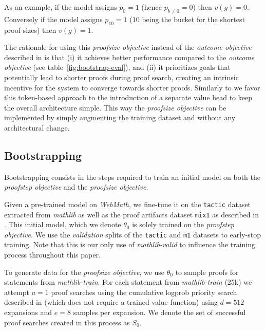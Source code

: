 \documentclass[nohyperref]{article}
\theoremstyle{plain}
\theoremstyle{definition}
\theoremstyle{remark}
\begin{document}
As an example, if the model assigns $p_0=1$ (hence $p_{b \neq 0}=0$) then $v(g)=0$. Conversely if the model assigns $p_{10}=1$ ($10$ being the bucket for the shortest proof sizes) then $v(g)=1$.

The rationale for using this \textit{proofsize objective} instead of the \textit{outcome objective} described in \citet{polu2020generative} is that (i) it achieves better performance compared to the \textit{outcome objective} (see table~\ref{fig:bootstrap-eval}), and (ii) it prioritizes goals that potentially lead to shorter proofs during proof search, creating an intrinsic incentive for the system to converge towards shorter proofs. Similarly to \citet{polu2020generative} we favor this token-based approach to the introduction of a separate value head to keep the overall architecture simple. This way the \textit{proofsize objective} can be implemented by simply augmenting the training dataset and without any architectural change.


\subsection{Bootstrapping}
\label{boostrapping}

Bootstrapping consists in the steps required to train an initial model on both the \textit{proofstep objective} and the \textit{proofsize objective}.

Given a pre-trained model on \textit{WebMath}, we fine-tune it on the \texttt{tactic} dataset extracted from \textit{mathlib} as well as the proof artifacts dataset \texttt{mix1} as described in \citet{han2021proof}. This initial model, which we denote $\theta_0$ is solely trained on the \textit{proofstep objective}. We use the \textit{validation} splits of the \texttt{tactic} and \texttt{m1} datasets to early-stop training. Note that this is our only use of \textit{mathlib-valid} to influence the training process throughout this paper.

To generate data for the \textit{proofsize objective}, we use $\theta_0$ to sample proofs for statements from \textit{mathlib-train}. For each statement from \textit{mathlib-train} (25k) we attempt $a=1$ proof searches using the cumulative logprob priority search described in \citet{polu2020generative} (which does not require a trained value function) using $d=512$ expansions and $e=8$ samples per expansion. We denote the set of successful proof searches created in this process as $S_0$.
\end{document}
